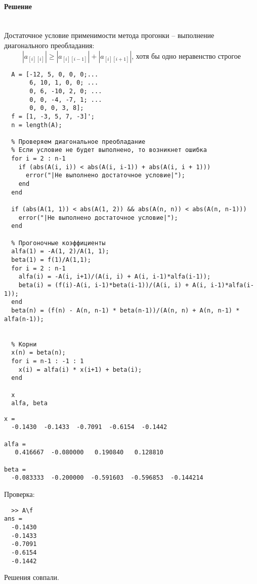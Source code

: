\paragraph{Решение} ~\\
Достаточное условие применимости метода прогонки -- выполнение диагонального преобладания:
\[
  |a_{[i][i]}| \geq |a_{[i][i-1]}| + |a_{[i][i+1]}| \text{, хотя бы одно неравенство строгое}
\]
\begin{lstlisting}
  A = [-12, 5, 0, 0, 0;...
       6, 10, 1, 0, 0; ...
       0, 6, -10, 2, 0; ...
       0, 0, -4, -7, 1; ...
       0, 0, 0, 3, 8];
  f = [1, -3, 5, 7, -3]';
  n = length(A);

  % Проверяем диагональное преобладание
  % Если условие не будет выполнено, то возникнет ошибка
  for i = 2 : n-1
    if (abs(A(i, i)) < abs(A(i, i-1)) + abs(A(i, i + 1)))
      error("|Не выполнено достаточное условие|");
    end
  end

  if (abs(A(1, 1)) < abs(A(1, 2)) && abs(A(n, n)) < abs(A(n, n-1)))
    error("|Не выполнено достаточное условие|");
  end

  % Прогоночные коэффициенты
  alfa(1) = -A(1, 2)/A(1, 1);
  beta(1) = f(1)/A(1,1);
  for i = 2 : n-1
    alfa(i) = -A(i, i+1)/(A(i, i) + A(i, i-1)*alfa(i-1));
    beta(i) = (f(i)-A(i, i-1)*beta(i-1))/(A(i, i) + A(i, i-1)*alfa(i-1));
  end
  beta(n) = (f(n) - A(n, n-1) * beta(n-1))/(A(n, n) + A(n, n-1) * alfa(n-1));


  % Корни
  x(n) = beta(n);
  for i = n-1 : -1 : 1
    x(i) = alfa(i) * x(i+1) + beta(i);
  end

  x
  alfa, beta
\end{lstlisting}
\begin{lstlisting}[backgroundcolor=\color{cyan}]
  x =
  -0.1430  -0.1433  -0.7091  -0.6154  -0.1442

alfa =
   0.416667  -0.080000   0.190840   0.128810

beta =
  -0.083333  -0.200000  -0.591603  -0.596853  -0.144214
\end{lstlisting}
Проверка:
\begin{lstlisting}
  >> A\f
ans =
  -0.1430
  -0.1433
  -0.7091
  -0.6154
  -0.1442
\end{lstlisting}
Решения совпали.

